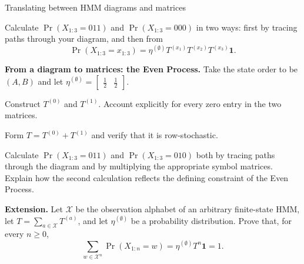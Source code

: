 \begin{exercise}[Core]{Translating between HMM diagrams and matrices}
\begin{parts}
\begin{subparts}
        \item Calculate $\Pr(X_{1:3}=011)$ and
          $\Pr(X_{1:3}=000)$ in two ways: first by tracing paths through your
          diagram, and then from
          \[
            \Pr(X_{1:3}=x_{1:3})
              =\eta^{(\emptyset)}
                T^{(x_1)}T^{(x_2)}T^{(x_3)}\mathbf 1.
          \]
      \end{subparts}

    \item \begin{minipage}[t]{\linewidth}
      \textbf{From a diagram to matrices: the Even Process.}
      Take the state order to be $(A,B)$ and let
      $\eta^{(\emptyset)}=\begin{bmatrix}\tfrac12&\tfrac12\end{bmatrix}$.
      \par\nobreak
      {\centering
        \par}
      \end{minipage}
      \begin{subparts}
        \item Construct $T^{(0)}$ and $T^{(1)}$. Account explicitly for every
          zero entry in the two matrices.

        \item Form $T=T^{(0)}+T^{(1)}$ and verify that it is row-stochastic.

        \item Calculate $\Pr(X_{1:3}=011)$ and
          $\Pr(X_{1:3}=010)$ both by tracing paths through the diagram and by
          multiplying the appropriate symbol matrices. Explain how the second
          calculation reflects the defining constraint of the Even Process.
      \end{subparts}

    \item \textbf{Extension.} Let $\mathcal X$ be the observation alphabet of
      an arbitrary finite-state HMM, let
      $T=\sum_{a\in\mathcal X}T^{(a)}$, and let
      $\eta^{(\emptyset)}$ be a probability distribution. Prove that, for
      every $n\geq 0$,
      \[
        \sum_{w\in\mathcal X^n}\Pr(X_{1:n}=w)
          =\eta^{(\emptyset)}T^n\mathbf 1
          =1.
      \]
  \end{parts}


\end{exercise}
